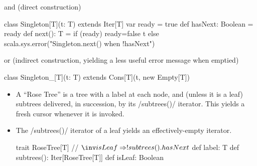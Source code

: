 \documentclass{ip3}
\begin{document}
\begin{foil}
\begin{exercise}
\begin{answer}
\begin{enumerate}
and (direct construction)
\begin{-code}
       class Singleton[T](t: T) extends Iter[T] {
          var ready = true
          def hasNext: Boolean = ready
          def next():  T = 
              if (ready) { 
                 ready=false
                 t 
              } 
              else 
                 scala.sys.error("Singleton.next() when !hasNext")
        }
\end{-code}
or (indirect construction, yielding a less useful error message when emptied)
\begin{-code}
       class Singleton_[T](t: T) extends Cons[T](t, new Empty[T])  
\end{-code}
        
\end{enumerate} 
\end{answer} 
\end{exercise}
\end{foil}



\begin{foil}
\begin{itemize}
\item A ``Rose Tree'' is a tree with a label at each node, and (unless
it is a leaf) subtrees delivered, in succession, by its \sc/subtrees()/ iterator.
This yields a fresh cursor whenever it is invoked. 

\item The \sc/subtrees()/ iterator of a leaf yields an effectively-empty iterator.

\begin{code}

          trait RoseTree[T] {
            // $\inv isLeaf \Rightarrow !subtrees().hasNext$
            def label:      T
            def subtrees(): Iter[RoseTree[T]]
            def isLeaf:     Boolean 
          } 
\end{code}
\end{itemize}
\end{foil}
\end{document}
